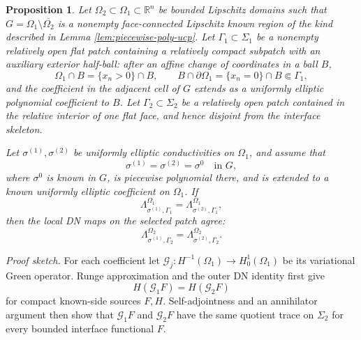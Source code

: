 \documentclass[10pt,a4paper]{amsart}
\newtheorem{proposition}[theorem]{Proposition}
\newcommand{\R}{\mathbb R}
\newcommand{\DN}{\Lambda}
\begin{document}
\begin{proposition}
\label{prop:inner-extension}
Let \(\Omega_2\subset\Omega_1\subset\R^n\) be bounded Lipschitz domains such
that \(G=\Omega_1\setminus\overline{\Omega_2}\) is a nonempty face-connected
Lipschitz known region of the kind described in Lemma
\ref{lem:piecewise-poly-ucp}.  Let \(\Gamma_1\subset\Sigma_1\) be a nonempty
relatively open flat patch containing a relatively compact subpatch with an
auxiliary exterior half-ball: after an affine change of coordinates in a ball
\(B\),
\begin{equation}
  \Omega_1\cap B=\{x_n>0\}\cap B,
  \qquad
  B\cap\partial\Omega_1=\{x_n=0\}\cap B\Subset \Gamma_1,
\end{equation}
and the coefficient in the adjacent cell of \(G\) extends as a uniformly
elliptic polynomial coefficient to \(B\).  Let
\(\Gamma_2\subset\Sigma_2\) be a relatively open patch contained in the
relative interior of one flat face, and hence disjoint from the interface
skeleton.

Let \(\sigma^{(1)},\sigma^{(2)}\) be uniformly elliptic conductivities on
\(\Omega_1\), and assume that
\begin{equation}
  \sigma^{(1)}=\sigma^{(2)}=\sigma^0
  \quad\text{in }G,
\end{equation}
where \(\sigma^0\) is known in \(G\), is piecewise polynomial there, and is
extended to a known uniformly elliptic coefficient on \(\Omega_1\).  If
\begin{equation}
  \DN^{\Omega_1}_{\sigma^{(1)},\Gamma_1}
  =\DN^{\Omega_1}_{\sigma^{(2)},\Gamma_1},
  \label{eq:outer-local-equality-inner-section}
\end{equation}
then the local DN maps on the selected patch agree:
\begin{equation}
  \DN^{\Omega_2}_{\sigma^{(1)},\Gamma_2}
  =\DN^{\Omega_2}_{\sigma^{(2)},\Gamma_2}.
  \label{eq:inner-dn-equality}
\end{equation}
\end{proposition}

\noindent\emph{Proof sketch.}
For each coefficient let \(\mathcal G_j:H^{-1}(\Omega_1)\to
H^1_0(\Omega_1)\) be its variational Green operator.  Runge approximation and
the outer DN identity first give
\begin{equation}
  H(\mathcal G_1F)=H(\mathcal G_2F)
\end{equation}
for compact known-side sources \(F,H\).  Self-adjointness and an annihilator
argument then show that \(\mathcal G_1F\) and \(\mathcal G_2F\) have the same
quotient trace on \(\Sigma_2\) for every bounded interface functional \(F\).
\end{document}
